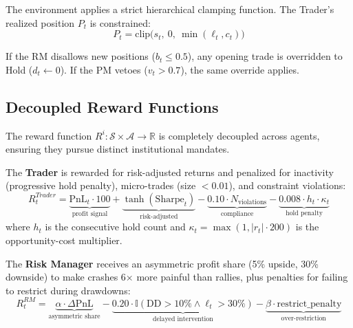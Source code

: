 \documentclass[11pt]{article}
\begin{document}
The environment applies a strict hierarchical clamping function. The Trader's realized position $P_t$ is constrained:
\begin{equation}
    P_t = \text{clip}\Big(s_t, \ 0, \ \min(\ell_t, c_t)\Big)
\end{equation}

If the RM disallows new positions ($b_t \leq 0.5$), any opening trade is overridden to Hold ($d_t \leftarrow 0$). If the PM vetoes ($v_t > 0.7$), the same override applies.

\subsection{Decoupled Reward Functions}
\label{sec:rewards}
The reward function $R^i: \mathcal{S} \times \mathcal{A} \rightarrow \mathbb{R}$ is completely decoupled across agents, ensuring they pursue distinct institutional mandates.

The \textbf{Trader} is rewarded for risk-adjusted returns and penalized for inactivity (progressive hold penalty), micro-trades (size $< 0.01$), and constraint violations:
\begin{equation}
    R_t^{Trader} = \underbrace{\text{PnL}_t \cdot 100}_{\text{profit signal}} + \underbrace{\tanh(\text{Sharpe}_t)}_{\text{risk-adjusted}} - \underbrace{0.10 \cdot N_{\text{violations}}}_{\text{compliance}} - \underbrace{0.008 \cdot h_t \cdot \kappa_t}_{\text{hold penalty}}
\end{equation}
where $h_t$ is the consecutive hold count and $\kappa_t = \max(1, |r_t| \cdot 200)$ is the opportunity-cost multiplier.

The \textbf{Risk Manager} receives an asymmetric profit share (5\% upside, 30\% downside) to make crashes 6$\times$ more painful than rallies, plus penalties for failing to restrict during drawdowns:
\begin{equation}
    R_t^{RM} = \underbrace{\alpha \cdot \Delta\text{PnL}}_{\text{asymmetric share}} - \underbrace{0.20 \cdot \mathbb{I}(\text{DD} > 10\% \wedge \ell_t > 30\%)}_{\text{delayed intervention}} - \underbrace{\beta \cdot \text{restrict\_penalty}}_{\text{over-restriction}}
\end{equation}
\end{document}
